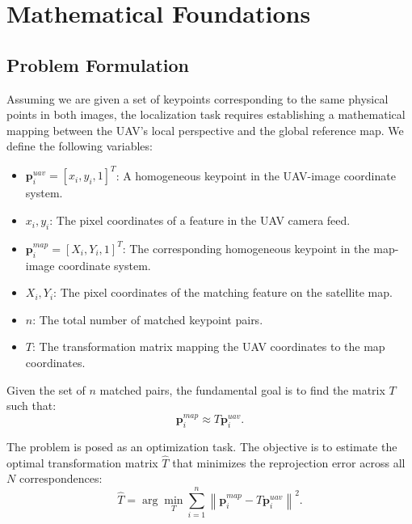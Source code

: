 \section{Mathematical Foundations}\label{sec:math_foundations}

\subsection{Problem Formulation}\label{subsec:problem_formulation}
Assuming we are given a set of keypoints corresponding to the same physical points in both images, the localization task requires establishing a mathematical mapping between the UAV's local perspective and the global reference map. We define the following variables:

\begin{itemize}
    \item $\mathbf{p}_i^{uav} = [x_i, y_i, 1]^T$: A homogeneous keypoint in the UAV-image coordinate system.
    \item $x_i, y_i$: The pixel coordinates of a feature in the UAV camera feed.
    \item $\mathbf{p}_i^{map} = [X_i, Y_i, 1]^T$: The corresponding homogeneous keypoint in the map-image coordinate system.
    \item $X_i, Y_i$: The pixel coordinates of the matching feature on the satellite map.
    \item $n$: The total number of matched keypoint pairs.
    \item $T$: The transformation matrix mapping the UAV coordinates to the map coordinates.
\end{itemize}

Given the set of $n$ matched pairs, the fundamental goal is to find the matrix $T$ such that:
\begin{equation}
\mathbf{p}_i^{map} \approx T\mathbf{p}_i^{uav}.
\end{equation}

The problem is posed as an optimization task. The objective is to estimate the optimal transformation matrix $\hat{T}$ that minimizes the reprojection error across all $N$ correspondences:
\begin{equation}
\hat{T} = \arg\min_T \sum_{i=1}^{n} \left\|\mathbf{p}_i^{map} - T\mathbf{p}_i^{uav}\right\|^2.
\end{equation}

